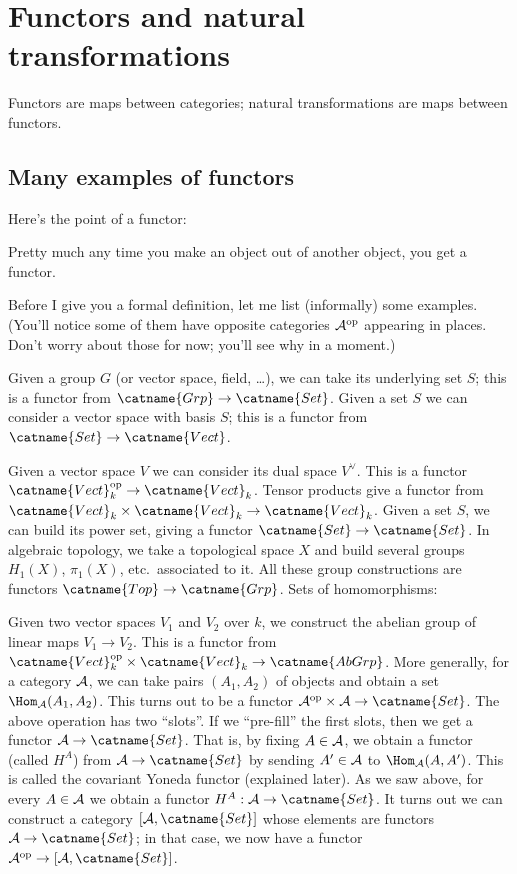 \chapter{Functors and natural transformations}
\label{ch:functors}
Functors are maps between categories; natural transformations are maps between functors.

\section{Many examples of functors}
Here's the point of a functor:
\begin{moral}
	Pretty much any time you make an object out of another object,
	you get a functor.
\end{moral}
Before I give you a formal definition, let me list (informally) some examples.
(You'll notice some of them have opposite categories $\AA\op$ appearing in places.
Don't worry about those for now; you'll see why in a moment.)
\begin{itemize}
	\ii Given a group $G$ (or vector space, field, \dots), we can take its underlying set $S$;
	this is a functor from $\catname{Grp} \to \catname{Set}$.
	\ii Given a set $S$ we can consider a vector space with basis $S$;
	this is a functor from $\catname{Set} \to \catname{Vect}$.

	\ii Given a vector space $V$ we can consider its dual space $V^\vee$.
	This is a functor $\catname{Vect}_k\op \to \catname{Vect}_k$.
	\ii Tensor products give a functor from $\catname{Vect}_k \times \catname{Vect}_k \to \catname{Vect}_k$.
	\ii Given a set $S$, we can build its power set, giving a functor $\catname{Set} \to \catname{Set}$.
	\ii In algebraic topology, we take a topological space $X$ and build several groups $H_1(X)$, $\pi_1(X)$,
	etc.\ associated to it. All these group constructions are functors $\catname{Top} \to \catname{Grp}$.
	\ii Sets of homomorphisms:
	\begin{itemize}
		\ii Given two vector spaces $V_1$ and $V_2$ over $k$,
		we construct the abelian group of linear maps $V_1 \to V_2$.
		This is a functor from $\catname{Vect}_k\op \times \catname{Vect}_k \to \catname{AbGrp}$.
		\ii More generally, for a category $\AA$, we can take pairs $(A_1, A_2)$ of objects and
		obtain a set $\Hom_{\AA}(A_1, A_2)$.
		This turns out to be a functor $\AA\op \times \AA \to \catname{Set}$.
		\ii The above operation has two ``slots''.
		If we ``pre-fill'' the first slots, then we get a functor $\AA \to \catname{Set}$.
		That is, by fixing $A \in \AA$, we obtain a functor (called $H^A$)
		from $\AA \to \catname{Set}$ by sending $A' \in \AA$ to $\Hom_{\AA} (A, A')$.
		This is called the covariant Yoneda functor (explained later).
		\ii As we saw above, for every $A \in \AA$ we obtain a functor $H^A : \AA \to \catname{Set}$.
		It turns out we can construct a category $[\AA, \catname{Set}]$
		whose elements are functors $\AA \to \catname{Set}$;
		in that case, we now have a functor $\AA\op \to [\AA, \catname{Set}]$.
	\end{itemize}
\end{itemize}

